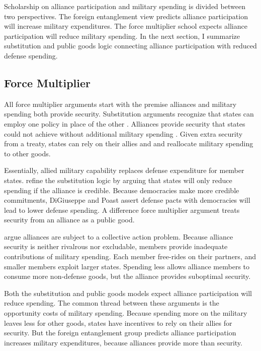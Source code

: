 \documentclass[12pt]{article}
\begin{document}
Scholarship on alliance participation and military spending is divided between two perspectives. 
The foreign entanglement view predicts alliance participation will increase military expenditures.
The force multiplier school expects alliance participation will reduce military spending. 
In the next section, I summarize substitution and public goods logic connecting alliance participation with reduced defense spending. 


\subsection{Force Multiplier} 


All force multiplier arguments start with the premise alliances and military spending both provide security.
Substitution arguments recognize that states can employ one policy in place of the other \citep{MostStarr1989}.  
Alliances provide security that states could not achieve without additional military spending \citep{Morrow1993, Conybeare1994}. 
Given extra security from a treaty, states can rely on their allies and and reallocate military spending to other goods. 


Essentially, allied military capability replaces defense expenditure for member states. 
\citet{DigiuseppePoast2016} refine the substitution logic by arguing that states will only reduce spending if the alliance is credible. 
Because democracies make more credible commitments, DiGiuseppe and Poast assert defense pacts with democracies will lead to lower defense spending. 
A difference force multiplier argument treats security from an alliance as a public good. 


\citet{OlsonZeckhauser1966} argue alliances are subject to a collective action problem.
Because alliance security is neither rivalrous nor excludable, members provide inadequate contributions of military spending. 
Each member free-rides on their partners, and smaller members exploit larger states. 
Spending less allows alliance members to consume more non-defense goods, but the alliance provides suboptimal security. 


Both the substitution and public goods models expect alliance participation will reduce spending. 
The common thread between these arguments is the opportunity costs of military spending. 
Because spending more on the military leaves less for other goods, states have incentives to rely on their allies for security. 
But the foreign entanglement group predicts alliance participation increases military expenditures, because alliances provide more than security. 
\end{document}
